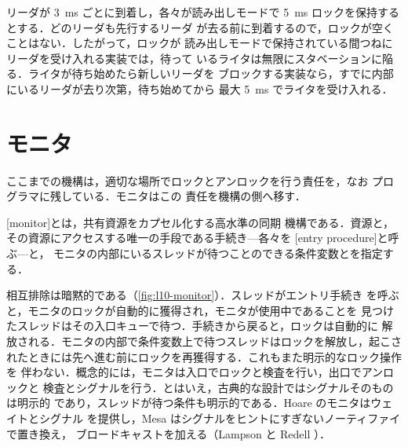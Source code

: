 \documentclass[../main.tex]{subfiles}
\begin{document}
\begin{example}
  リーダが \SI{3}{\milli\second} ごとに到着し，各々が読み出しモードで
  \SI{5}{\milli\second} ロックを保持するとする．どのリーダも先行するリーダ
  が去る前に到着するので，ロックが空くことはない．したがって，ロックが
  読み出しモードで保持されている間つねにリーダを受け入れる実装では，待って
  いるライタは無限にスタベーションに陥る．ライタが待ち始めたら新しいリーダを
  ブロックする実装なら，すでに内部にいるリーダが去り次第，待ち始めてから
  最大 \SI{5}{\milli\second} でライタを受け入れる．
\end{example}

\section{モニタ}
\label{sec:l10-monitor}

ここまでの機構は，適切な場所でロックとアンロックを行う責任を，なお
プログラマに残している．モニタはこの
責任を機構の側へ移す．

\begin{definition}[モニタ]
  [monitor]とは，共有資源をカプセル化する高水準の同期
  機構である．資源と，その資源にアクセスする唯一の手段である手続き---各々を
  [entry procedure]と呼ぶ---と，
  モニタの内部にいるスレッドが待つことのできる条件変数とを指定する．
\end{definition}

相互排除は暗黙的である（\cref{fig:l10-monitor}）．スレッドがエントリ手続き
を呼ぶと，モニタのロックが自動的に獲得され，モニタが使用中であることを
見つけたスレッドはその入口キューで待つ．手続きから戻ると，ロックは自動的に
解放される．モニタの内部で条件変数上で待つスレッドはロックを解放し，起こさ
れたときには先へ進む前にロックを再獲得する．これもまた明示的なロック操作を
伴わない．概念的には，モニタは入口でロックと検査を行い，出口でアンロックと
検査とシグナルを行う．とはいえ，古典的な設計ではシグナルそのものは明示的
であり，スレッドが待つ条件も明示的である．Hoare のモニタはウェイトとシグナル
を提供し，Mesa はシグナルをヒントにすぎないノーティファイで置き換え，
ブロードキャストを加える（Lampson と Redell \cite{lampson1980}）．%
\end{document}
